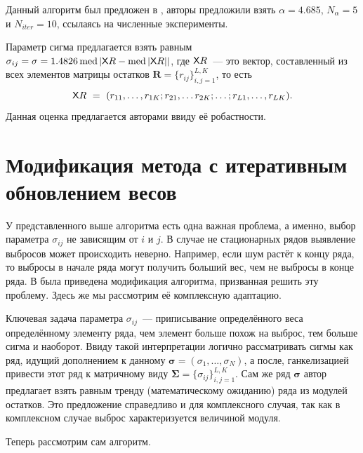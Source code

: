 \documentclass[specialist,
               substylefile = spbu.rtx,
               subf,href,colorlinks=true, 12pt]{disser}
\DeclareMathOperator{\med}{med}
\begin{document}
Данный алгоритм был предложен в \cite{Chen}, авторы предложили взять $\alpha = 4.685$, $N_{\alpha} = 5$ и $N_{iter} = 10$, ссылаясь на численные эксперименты.

Параметр сигма предлагается взять равным $\sigma_{ij} = \sigma = 1.4826 \med {|\tX{R}-\med {|\tX{R}|}|}$, где $\textsf{X}{R}$~--- это вектор, составленный из всех элементов матрицы остатков $\mathbf{R} = \{r_{ij}\}_{i,j=1}^{L,K}$, то есть
\begin{equation*}
	\textsf{X}{R}~=~(r_{11},\ldots,r_{1K}; r_{21},\ldots r_{2K};\ldots;r_{L1},\ldots,r_{LK}).
\end{equation*} 
Данная оценка предлагается авторами ввиду её робастности.

\section{Модификация метода с итеративным обновлением весов}

У представленного выше алгоритма есть одна важная проблема, а именно, выбор параметра $\sigma_{ij}$ не зависящим от $i$ и $j$. В случае не стационарных рядов выявление выбросов может происходить неверно. Например, если шум растёт к концу ряда, то выбросы в начале ряда могут получить больший вес, чем не выбросы в конце ряда. В \cite{Tretyakova20} была приведена модификация алгоритма, призванная решить эту проблему. Здесь же мы рассмотрим её комплексную адаптацию.

Ключевая задача параметра $\sigma_{ij}$~--- приписывание определённого веса определённому элементу ряда, чем элемент больше похож на выброс, тем больше сигма и наоборот. Ввиду такой интерпретации логично рассматривать сигмы как ряд, идущий дополнением к данному $\bm{\sigma} = (\sigma_1,\ldots,\sigma_N)$, а после, ганкелизацией привести этот ряд к матричному виду $\mathbf{\Sigma}=\{\sigma_{ij}\}_{i,j=1}^{L,K}$. Сам же ряд $\bm{\sigma}$ автор \cite{Tretyakova20} предлагает взять равным тренду (математическому ожиданию) ряда из модулей остатков. Это предложение справедливо и для комплексного случая, так как в комплексном случае выброс характеризуется величиной модуля.

Теперь рассмотрим сам алгоритм.
\end{document}
